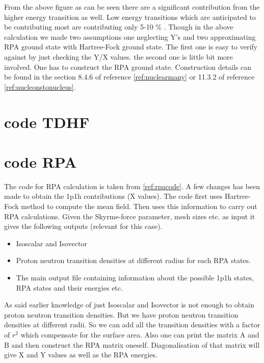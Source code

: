 \documentclass[a4paper]{paper}
\begin{document}
                From the above figure as can be seen there are a significant contribution from the higher energy transition as well. Low energy transitions which are anticipated to be contributing most are contributing only 5-10 \% . Though in the above calculation we made two assumptions one neglecting Y's and two approximating RPA ground state with Hartree-Fock ground state. The first one is easy to verify against by just checking the Y/X values. the second one is little bit more  involved. One has to construct the RPA ground state. Construction details can be found in the section 8.4.6 of reference \ref{ref:nuclearmany} or 11.3.2 of reference \ref{ref:nucleonstonucleus}.
                
        \begin{appendices}\label{appendices}
            \section{code TDHF}
            \section{code RPA}
            The code for RPA calculation is taken from \ref{ref:rpacode}. A few changes has been made to obtain the 1p1h contributions (X values).
            The code first uses Hartree-Fock method to compute the mean field. Then uses this information to carry out RPA calculations. Given the Skyrme-force parameter, mesh sizes etc. as input it gives the following outputs (relevant for this case). 
            \begin{itemize}
                \item Isoscalar and Isovector 
                \item Proton neutron transition densities at different radius for each RPA states.
                \item The main output file containing information about the possible 1p1h states, RPA states and their energies etc.
            \end{itemize} 
            As said earlier knowledge of just Isoscalar and Isovector is not enough to obtain proton neutron transition densities. But we have proton neutron transition densities at different radii. So we can add all the transition densities with a factor of $r^2$ which compensate for the surface area. Also one can print the matrix A and B and then construct the RPA matrix oneself. Diagonalisation of that matrix will give X and Y values as well as the RPA energies.
        \end{appendices}
\end{document}

